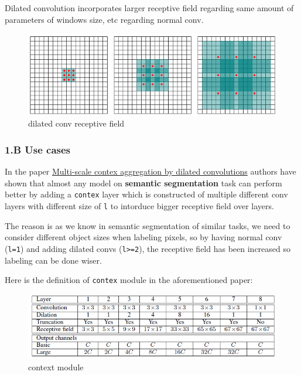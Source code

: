 \documentclass[11pt]{article}
\makeatletter
\def\maxwidth{\ifdim\Gin@nat@width>\linewidth\linewidth
    \else\Gin@nat@width\fi}
\let\Oldincludegraphics\includegraphics
\renewcommand{\includegraphics}[1]{\Oldincludegraphics[width=.8\maxwidth]{#1}}
\makeatother
\begin{document}
Dilated convolution incorporates larger receptive field regarding same
amount of parameters of windows size, etc regarding normal conv.

\begin{figure}
\centering
\includegraphics{wiki/1_3.png}
\caption{dilated conv receptive field}
\end{figure}

    \hypertarget{b-use-cases}{%
\subsubsection{1.B Use cases}\label{b-use-cases}}

In the paper
\href{http://vladlen.info/papers/dilated-convolutions.pdf}{Multi-scale
contex aggregation by dilated convolutions} authors have shown that
almost any model on \textbf{semantic segmentation} task can perform
better by adding a \texttt{contex} layer which is constructed of
multiple different conv layers with different size of \texttt{l} to
intorduce bigger receptive field over layers.

The reason is as we know in semantic segmentation of similar tasks, we
need to consider different object sizes when labeling pixels, so by
having normal conv (\texttt{l=1}) and adding dilated convs
(\texttt{l\textgreater{}=2}), the receptive field has been increased so
labeling can be done wiser.

Here is the definition of \texttt{contex} module in the aforementioned
paper:

\begin{figure}
\centering
\includegraphics{wiki/1_4.png}
\caption{context module}
\end{figure}
\end{document}
